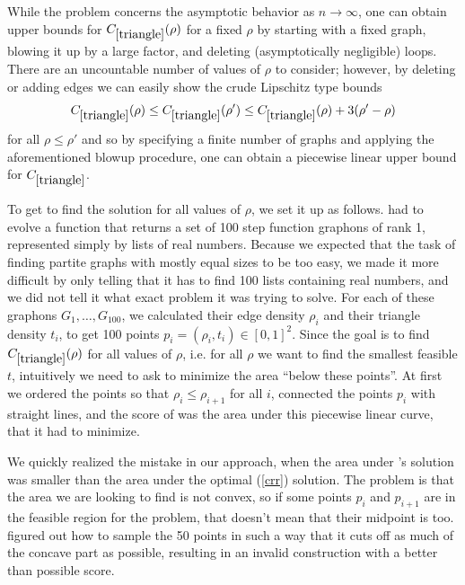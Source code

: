 While the problem concerns the asymptotic behavior as $n \to \infty$, one can obtain upper bounds for $C_{\ref{triangle}}(\rho)$ for a fixed $\rho$ by starting with a fixed graph, blowing it up by a large factor, and deleting (asymptotically negligible) loops. 
There are an uncountable number of values of $\rho$ to consider; however, by deleting or adding edges we can easily show the crude Lipschitz type bounds
\begin{equation}\label{eq:crudebound}
C_{\ref{triangle}}(\rho) \leq C_{\ref{triangle}}(\rho') \leq C_{\ref{triangle}}(\rho) + 3 (\rho'-\rho)
\end{equation}
for all $\rho\leq\rho'$ and so by specifying a finite number of graphs and applying the aforementioned blowup procedure, one can obtain a piecewise linear upper bound for $C_{\ref{triangle}}$.

To get \AlphaEvolve to find the solution for all values of $\rho$, we set it up as follows. \AlphaEvolve had to evolve a function that returns a set of 100 step function graphons of rank 1, represented simply by lists of real numbers. Because we expected that the task of finding partite graphs with mostly equal sizes to be too easy, we made it more difficult by only telling \AlphaEvolve that it has to find 100 lists containing real numbers, and we did not tell it what exact problem it was trying to solve. For each of these graphons $G_1,\ldots,G_{100}$, we calculated their edge density $\rho_i$ and their triangle density $t_i$, to get 100 points $p_i=(\rho_i,t_i)\in [0,1]^2$. Since the goal is to find $C_{\ref{triangle}}(\rho)$ for all values of $\rho$, i.e. for all $\rho$ we want to find the smallest feasible $t$, intuitively we need to ask \AlphaEvolve to minimize the area ``below these points''. At first we ordered the points so that $\rho_i\leq \rho_{i+1}$ for all $i$, connected the points $p_i$ with straight lines, and the score of \AlphaEvolve was the area under this piecewise linear curve, that it had to minimize.

We quickly realized the mistake in our approach, when the area under \AlphaEvolve's solution was smaller than the area under the optimal (\ref{crr}) solution. The problem is that the area we are looking to find is not convex, so if some points $p_i$ and $p_{i+1}$ are in the feasible region for the problem, that doesn't mean that their midpoint is too. \AlphaEvolve figured out how to sample the 50 points in such a way that it cuts off as much of the concave part as possible, resulting in an invalid construction with a better than possible score.

